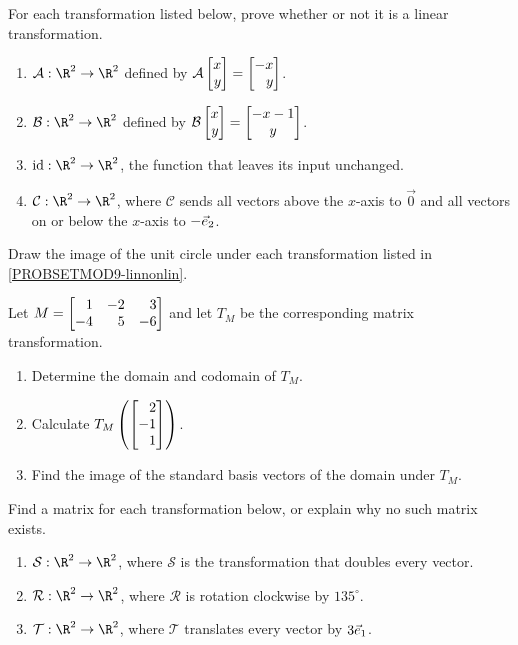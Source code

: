 \begin{exercises}
	\begin{problist}
		\prob For each transformation listed below, prove whether or not it is a linear transformation.
		\label{PROBSETMOD9-linnonlin}
		\begin{enumerate}
			\item $\mathcal A:\R^2\to\R^2$ defined by $\mathcal A\mat{x\\y}=\mat{-x\\y}$.
			\item $\mathcal B:\R^2\to\R^2$ defined by $\mathcal B\mat{x\\y}=\matc{-x-1\\y}$.
			\item $\Ident:\R^2\to\R^2$, the function that leaves its input unchanged.
			\item $\mathcal C:\R^2\to\R^2$, where $\mathcal C$ sends all vectors above the $x$-axis to $\vec 0$
				and all vectors on or below the $x$-axis to $-{\vec e_2}$.
		\end{enumerate}

		\prob Draw the image of the unit circle under each transformation listed in \ref{PROBSETMOD9-linnonlin}.

		\prob Let $M=\mat{1&-2&3\\-4&5&-6}$ and let $T_M$ be the corresponding matrix transformation.
		\begin{enumerate}
			\item Determine the domain and codomain of $T_M$.
			\item Calculate $T_M\left(\mat{2\\-1\\1}\right)$.
			\item Find the image of the standard basis vectors of the domain under $T_M$.
		\end{enumerate}

		\prob Find a matrix for each transformation below, or explain why no such matrix exists.
		\begin{enumerate}
			\item $\mathcal S:\R^{2}\to\R^{2}$, where $\mathcal S$ is the
				transformation that doubles every vector.

			\item $\mathcal R:\R^{2}\to\R^{2}$, where $\mathcal R$
				is rotation clockwise by $135^{\circ}$.

			\item $\mathcal T:\R^2\to\R^2$, where $\mathcal T$ translates every vector by $3{\vec e_1}$.


\end{enumerate}
\end{problist}
\end{exercises}
